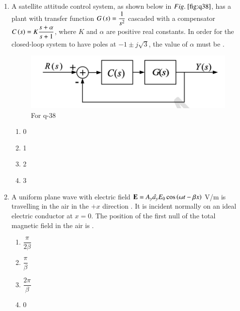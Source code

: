 \documentclass[journal,12pt,onecolumn]{IEEEtran}
\theoremstyle{remark}
\begin{document}
\begin{enumerate}
\item A satellite attitude control system, as shown below in $\figref{fig:q38}$, has a plant with transfer function $G\left(s\right) = \dfrac{1}{s^2}$ cascaded with a compensator $C\left(s\right) = K\dfrac{s+\alpha}{s+1}$, where $K$ and $\alpha$ are positive real constants. In order for the closed-loop system to have poles at $-1 \pm j\sqrt{3}$, the value of $\alpha$ must be \underline{\hspace{2cm}}.
\begin{figure}[H]
    \centering
    \includegraphics[width=0.5\columnwidth]{q38.png}
    \caption{For q-38}
    \label{fig:q38}
\end{figure}
\hfill{}
\begin{multicols}{4}
\begin{enumerate}
    \item 0
    \item 1
    \item 2
    \item 3
\end{enumerate}
\end{multicols}

\item A uniform plane wave with electric field $\mathbf{E} =A_y \hat{a_y } E_0 \cos\left(\omega t - \beta x\right)$ V/m is travelling in the air  in the $+x$ direction . It is incident normally on an ideal electric conductor  at $x = 0$. The position of the first null of the total magnetic field in the air  is \underline{\hspace{2cm}}.

\hfill{}
\begin{multicols}{4}
  \begin{enumerate}
    \item $\dfrac{\pi}{2\beta}$
    \item $\dfrac{\pi}{\beta}$
    \item $\dfrac{2\pi}{\beta}$
    \item $0$
\end{enumerate}  
\end{multicols}


\end{enumerate}
\end{document}
